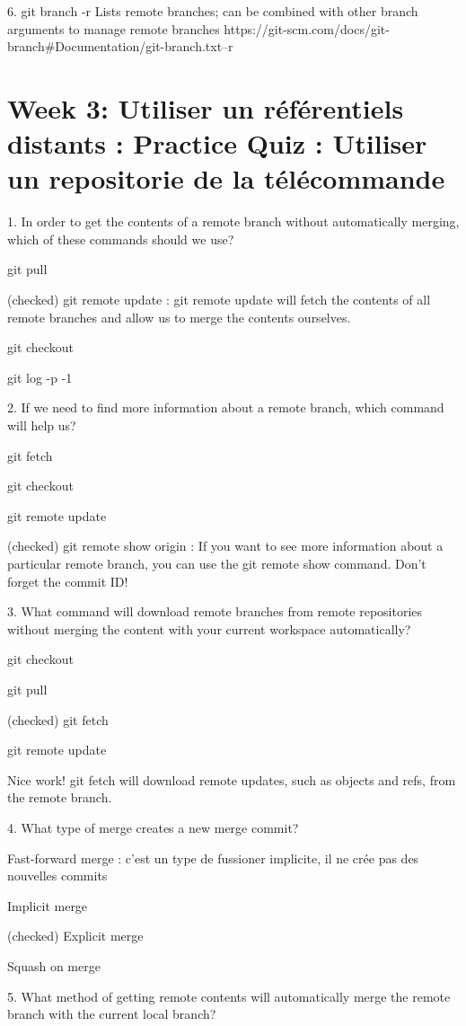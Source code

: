 \documentclass[11pt, onecolumn]{article}
\begin{document}
6. git branch -r  Lists remote branches; can be combined with other branch arguments to manage remote branches https://git-scm.com/docs/git-branch#Documentation/git-branch.txt--r


\section{Week 3: Utiliser un référentiels distants : Practice Quiz : Utiliser un repositorie de la télécommande}

1. In order to get the contents of a remote branch without automatically merging, which of these commands should we use?

git pull

(checked) git remote update  : git remote update will fetch the contents of all remote branches and allow us to merge the contents ourselves.

git checkout

git log -p -1


2. If we need to find more information about a remote branch, which command will help us?

git fetch

git checkout

git remote update

(checked) git remote show origin : If you want to see more information about a particular remote branch, you can use the git remote show command. Don't forget the commit ID!


3. What command will download remote branches from remote repositories without merging the content with your current workspace automatically?

git checkout

git pull

(checked) git fetch

git remote update

Nice work! git fetch will download remote updates, such as objects and refs, from the remote branch.


4. What type of merge creates a new merge commit?

Fast-forward merge : c'est un type de fussioner implicite, il ne crée pas des nouvelles commits

Implicit merge

(checked) Explicit merge

Squash on merge


5. What method of getting remote contents will automatically merge the remote branch with the current local branch?
\end{document}
